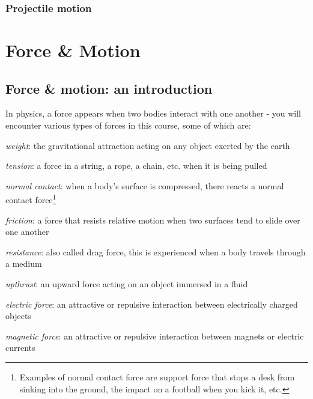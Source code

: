 \documentclass[a4paper,12pt]{book}
\begin{document}
\subsection*{Projectile motion}

\label{Q-projectile-eqn}

\cleardoublepage

\chapter{Force \& Motion}

\section{Force \& motion: an introduction}

In physics, a force appears when two bodies interact with one another - you will encounter various types of forces in this course, some of which are:
\begin{compactitem}
	\item[--] \emph{weight}: the gravitational attraction acting on any object exerted by the earth
	
	\item[--] \emph{tension}: a force in a string, a rope, a chain, etc. when it is being pulled
	
	\item[--] \emph{normal contact}: when a body's surface is compressed, there reacts a normal contact force\footnote{Examples of normal contact force are support force that stops a desk from sinking into the ground, the impact on a football when you kick it, etc.}
	
	\item[--] \emph{friction}: a force that resists relative motion when two surfaces tend to slide over one another
	
	\item[--] \emph{resistance}: also called drag force, this is experienced when a body travels through a medium

	
	\item[--] \emph{upthrust}: an upward force acting on an object immersed in a fluid
	
	\item[--] \emph{electric force}: an attractive or repulsive interaction between electrically charged objects
	\item[--] \emph{magnetic force}: an attractive or repulsive interaction between magnets or electric currents
\end{compactitem}
\end{document}
